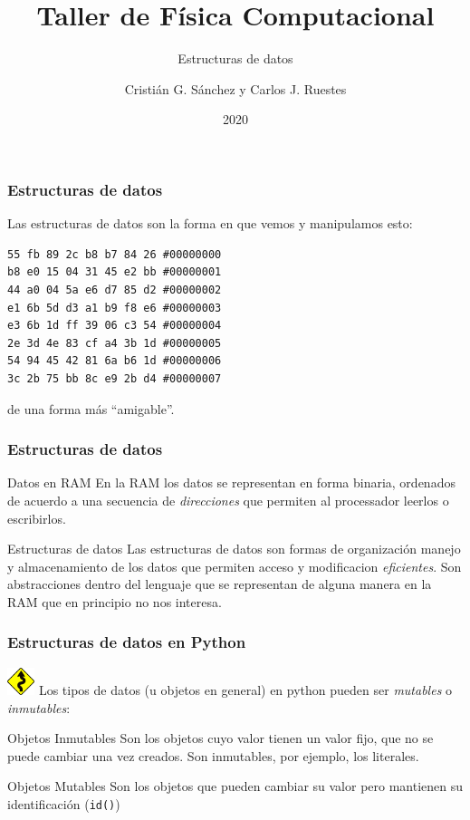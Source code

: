 \documentclass{beamer}
\title{Taller de Física Computacional}
\subtitle{Estructuras de datos}
\author{Cristián G. Sánchez y Carlos J. Ruestes}
\date{2020}
\begin{document}
\frame{\titlepage}

\begin{frame}[fragile]
    \frametitle{Estructuras de datos}
    Las estructuras de datos son la forma en que vemos y manipulamos esto:
    \begin{verbatim}
55 fb 89 2c b8 b7 84 26 #00000000 
b8 e0 15 04 31 45 e2 bb #00000001
44 a0 04 5a e6 d7 85 d2 #00000002
e1 6b 5d d3 a1 b9 f8 e6 #00000003
e3 6b 1d ff 39 06 c3 54 #00000004
2e 3d 4e 83 cf a4 3b 1d #00000005
54 94 45 42 81 6a b6 1d #00000006
3c 2b 75 bb 8c e9 2b d4 #00000007
    \end{verbatim}    
    de una forma más ``amigable''.
\end{frame}

\begin{frame}[fragile]
    \frametitle{Estructuras de datos}
    \begin{block}{Datos en RAM}
        En la RAM los datos se representan en forma binaria, ordenados de acuerdo a una secuencia de {\em direcciones} que permiten al processador
        leerlos o escribirlos. 
    \end{block}
    \begin{block}{Estructuras de datos}
        Las estructuras de datos son formas de organización manejo y almacenamiento de los datos que permiten acceso y modificacion {\em eficientes}.
        Son abstracciones dentro del lenguaje que se representan de alguna manera en la RAM que \alert{en principio} no nos interesa.
    \end{block}
\end{frame}


\begin{frame}
    \frametitle{Estructuras de datos en Python}
    \includegraphics[height=0.8cm, width=0.8cm]{figuras/sin.png}
        Los tipos de datos (u objetos en general) en python pueden ser {\em mutables} o {\em inmutables}:
        \begin{block}{Objetos Inmutables}
            Son los objetos cuyo valor tienen un valor fijo, que no se puede cambiar una vez creados. Son inmutables, por ejemplo, los literales.
        \end{block}
        \begin{block}{Objetos Mutables}
            Son los objetos que pueden cambiar su valor pero mantienen su identificación (\texttt{id()})
        \end {block}        
\end{frame}
\end{document}
